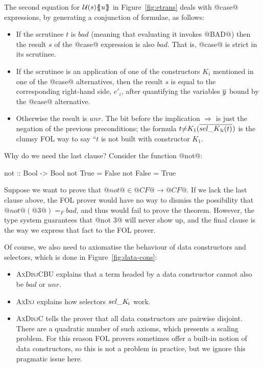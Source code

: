 The second equation for $\utrans{}{u}{s}$ in Figure~\ref{fig:etrans} deals with
@case@ expressions, by generating a conjunction of formulae, as follows:
\begin{itemize}
\item If the scrutinee $t$ is $bad$ (meaning that evaluating it invokes @BAD@) then
the result $s$ of the @case@ expression is also $bad$.  That is, @case@ is strict in
its scrutinee.
\item If the scrutinee is an application of one of the constructors $K_i$ mentioned
in one of the @case@ alternatives, then the result $s$ is equal to the corresponding
right-hand side, $e'_i$, after quantifying the variables $\ol{y}$ bound by the @case@ alternative.
\item Otherwise the result is $unr$.
The bit before the implication $\Rightarrow$ is just the
negation of the previous preconditions; the formula
  $t{\neq}K_1(\oln{{\sel{K_1}{i}}(t)}{})$
is the clumsy FOL way to say ``$t$ is not built with constructor $K_1$.
\end{itemize}
Why do we need the last clause? Consider the function @not@:
\begin{code}
  not :: Bool -> Bool
  not True = False
  not False = True
\end{code}
Suppose we want to prove that $@not@ \in @CF@ \rightarrow @CF@$.
If we lack the last clause above, the FOL prover would have
no way to dismiss the possibility that $@not@(@3@) =_F bad$, and thus
would fail to prove the theorem.  However, the type system guarantees
that @not 3@ will never show up, and the final clause is the way we express that
fact to the FOL prover.

Of course, we also need to axiomatise the behaviour of data constructors and
selectors, which is done in Figure~\ref{fig:data-cons}:
\begin{itemize}
\item \textsc{AxDisjCBU} explains that a term headed by a data constructor cannot
also be $bad$ or $unr$.
\item \textsc{AxInj} explains how selectors $\sel{K}{i}$ work.
\item \textsc{AxDisjC} tells the prover that all data constructors are pairwise disjoint.
There are a quadratic number of such axioms, which presents a scaling problem.
For this reason FOL provers sometimes offer a built-in notion of data constructors,
so this is not a problem in practice, but we ignore this pragmatic issue here.
\end{itemize}

